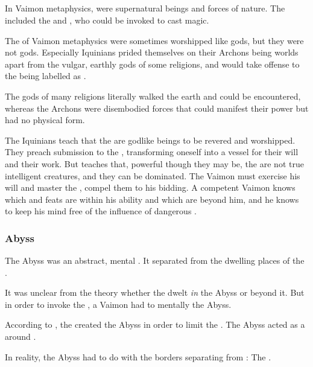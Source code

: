 \subsection{\Archons}
In Vaimon metaphysics, \Archons{} were supernatural beings and forces of nature. 
The \Archons{} included the  and , who could be invoked to cast magic.  

The \Archons of Vaimon metaphysics were sometimes worshipped like gods, but they were not gods. 
Especially Iquinians prided themselves on their Archons being worlds apart from the vulgar, earthly gods of some religions, and would take offense to the \Archons{} being labelled as . 

The gods of many religions literally walked the earth and could be encountered, whereas the Archons were disembodied forces that could manifest their power but had no physical form. 

The Iquinians teach that the \Archons are godlike beings to be revered and worshipped. 
They preach submission to the \sephiroth, transforming oneself into a vessel for their will and their work. 
But \ClanGeican teaches that, powerful though they may be, the \Archons are not true intelligent creatures, and they can be dominated. 
The Vaimon must exercise his will and master the \Archons, compel them to his bidding. 
A competent Vaimon knows which \Archons and feats are within his ability and which are beyond him, and he knows to keep his mind free of the influence of dangerous \Archons. 






\subsubsection{Abyss}
The Abyss was an abstract, mental . 
It separated  from the dwelling places of the \qliphoth. 

It was unclear from the theory whether the \qliphoth dwelt \emph{in} the Abyss or beyond it.
But in order to invoke the \qliphoth, a Vaimon had to mentally  the Abyss. 

According to , the \sephiroth created the Abyss in order to limit the . 
The Abyss acted as a  around \Atziluth. 

In reality, the Abyss had to do with the borders separating \Miith from :
The . 





